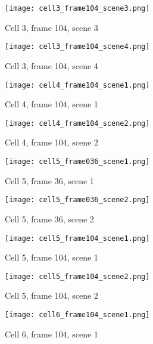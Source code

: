\begin{figure}[H]
\centering
  \texttt{[image: cell3\_frame104\_scene3.png]}
  \caption{Cell 3, frame 104, scene 3}
  \label{img:cell3_frame104_scene3}
\end{figure}

\begin{figure}[H]
\centering
  \texttt{[image: cell3\_frame104\_scene4.png]}
  \caption{Cell 3, frame 104, scene 4}
  \label{img:cell3_frame104_scene4}
\end{figure}

\begin{figure}[H]
\centering
  \texttt{[image: cell4\_frame104\_scene1.png]}
  \caption{Cell 4, frame 104, scene 1}
  \label{img:cell4_frame104_scene1}
\end{figure}

\begin{figure}[H]
\centering
  \texttt{[image: cell4\_frame104\_scene2.png]}
  \caption{Cell 4, frame 104, scene 2}
  \label{img:cell4_frame104_scene2}
\end{figure}

\begin{figure}[H]
\centering
  \texttt{[image: cell5\_frame036\_scene1.png]}
  \caption{Cell 5, frame 36, scene 1}
  \label{img:cell5_frame036_scene1}
\end{figure}

\begin{figure}[H]
\centering
  \texttt{[image: cell5\_frame036\_scene2.png]}
  \caption{Cell 5, frame 36, scene 2}
  \label{img:cell5_frame036_scene2}
\end{figure}

\begin{figure}[H]
\centering
  \texttt{[image: cell5\_frame104\_scene1.png]}
  \caption{Cell 5, frame 104, scene 1}
  \label{img:cell5_frame104_scene1}
\end{figure}

\begin{figure}[H]
\centering
  \texttt{[image: cell5\_frame104\_scene2.png]}
  \caption{Cell 5, frame 104, scene 2}
  \label{img:cell5_frame104_scene2}
\end{figure}

\begin{figure}[H]
\centering
  \texttt{[image: cell6\_frame104\_scene1.png]}
  \caption{Cell 6, frame 104, scene 1}
  \label{img:cell6_frame104_scene1}
\end{figure}

